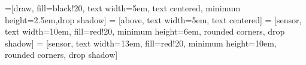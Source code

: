 \newcommand{\mx}[1]{\mathbf{\bm{#1}}} %
\newcommand{\vc}[1]{\mathbf{\bm{#1}}} %



=[draw, fill=black!20, text width=5em,
    text centered, minimum height=2.5em,drop shadow]
 = [above, text width=5em, text centered]
 = [sensor, text width=10em, fill=red!20,
    minimum height=6em, rounded corners, drop shadow]
 = [sensor, text width=13em, fill=red!20,
    minimum height=10em, rounded corners, drop shadow]

\def\blockdist{1.5}
\def\edgedist{2.5}

